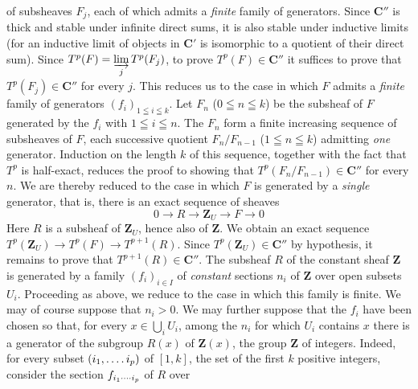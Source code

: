 
\noindent of subsheaves $F_j$, each of which admits a \textit{finite} family
of generators.
Since $\mathbf C''$ is thick and stable under infinite direct sums, it is also stable
under inductive limits (for an inductive limit of objects in $\mathbf C'$ is
isomorphic to a quotient of their direct sum). Since
$T^p(F)=\varinjlim\limits_j T^p(F_j)$,
to prove $T^p(F)\in \mathbf C''$ it suffices to prove that $T^p(F_j)\in \mathbf C''$ for every
$j$. This reduces us to the case in which $F$ admits a \textit{finite} family
of generators $(f_i)_{1\leqq i\leqq k}$.
Let $F_n$ ($0\leqq n\leqq k$) be the subsheaf of $F$ generated by the $f_i$ with
$1\leqq i\leqq n$. The $F_n$ form a finite increasing sequence of subsheaves of
$F$, each successive quotient $F_n/F_{n-1}$ ($1\leqq n\leqq k$) admitting \textit{one}
generator.
Induction on the length $k$ of this sequence, together with the fact that
$T^p$ is half-exact, reduces the proof to showing that
$T^p(F_n/F_{n-1})\in \mathbf C''$ for every $n$.
We are thereby reduced to the case in which $F$ is generated by a \textit{single}
generator, that is, there is an exact sequence of sheaves
\[
0\to R\to \mathbf Z_U\to F\to0
\]
Here $R$ is a subsheaf of $\mathbf Z_U$, hence also of $\mathbf Z$. We obtain an exact sequence
$T^p(\mathbf Z_U)\to T^p(F)\to T^{p+1}(R)$.
Since $T^p(\mathbf Z_U)\in \mathbf C''$ by hypothesis, it remains to prove that
$T^{p+1}(R)\in \mathbf C''$.
The subsheaf $R$ of the constant sheaf $\mathbf Z$ is generated by a family
$(f_i)_{i\in I}$ of \textit{constant} sections $n_i$ of $\mathbf Z$ over open subsets $U_i$.
Proceeding as above, we reduce to the case in which this family is finite. We
may of course suppose that $n_i>0$.
We may further suppose that the $f_i$ have been chosen so that, for every
$x\in\bigcup_i U_i$, among the $n_i$ for which $U_i$ contains $x$ there is a generator of
the subgroup $R(x)$ of $\mathbf Z(x)$, the group $\mathbf Z$ of integers. Indeed, for every
subset $(i_1,\mathinner{.\,.\,.\,.}i_p)$ of $[1,k]$, the set of the first $k$ positive
integers, consider the section $f_{i_1\mathinner{\cdotp\cdotp\cdotp\cdotp}i_p}$ of $R$ over
